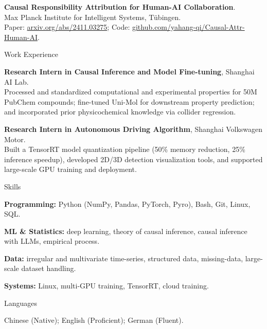 \documentclass[11pt,a4paper]{article}
\newcommand{\cvsection}[1]{%
  \vspace{1.35em}
  {\fontsize{25}{28}\selectfont #1}\par
  \vspace{0.38em}
}
\newcommand{\datedentry}[2]{%
  \noindent
  \makebox[0.17\textwidth][l]{#1}%
  \hspace{0.04\textwidth}%
  \parbox[t]{0.79\textwidth}{#2}\par
  \vspace{0.5em}
}
\begin{document}
\datedentry{Under Review}{\textbf{Causal Responsibility Attribution for Human-AI Collaboration}.\\
Max Planck Institute for Intelligent Systems, T\"ubingen.\\
Paper: \href{https://arxiv.org/abs/2411.03275}{arxiv.org/abs/2411.03275};
Code: \href{https://github.com/yahang-qi/Causal-Attr-Human-AI}{github.com/yahang-qi/Causal-Attr-Human-AI}.}

\cvsection{Work Experience}

\datedentry{2023}{\textbf{Research Intern in Causal Inference and Model Fine-tuning}, Shanghai AI Lab.\\
Processed and standardized computational and experimental properties for 50M PubChem compounds; fine-tuned Uni-Mol for downstream property prediction; and incorporated prior physicochemical knowledge via collider regression.}

\datedentry{2022}{\textbf{Research Intern in Autonomous Driving Algorithm}, Shanghai Volkswagen Motor.\\
Built a TensorRT model quantization pipeline (50\% memory reduction, 25\% inference speedup), developed 2D/3D detection visualization tools, and supported large-scale GPU training and deployment.}

\cvsection{Skills}

\datedentry{}{\textbf{Programming:} Python (NumPy, Pandas, PyTorch, Pyro), Bash, Git, Linux, SQL.}
\datedentry{}{\textbf{ML \& Statistics:} deep learning, theory of causal inference, causal inference with LLMs, empirical process.}
\datedentry{}{\textbf{Data:} irregular and multivariate time-series, structured data, missing-data, large-scale dataset handling.}
\datedentry{}{\textbf{Systems:} Linux, multi-GPU training, TensorRT, cloud training.}

\cvsection{Languages}
Chinese (Native); English (Proficient); German (Fluent).
\end{document}
